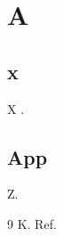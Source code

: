 \documentclass{book}
\begin{document}
\part{A}
\chapter{x}
X \cite{k}.
\appendix
\chapter{App}
Z.
\backmatter
\begin{thebibliography}{9}
 K. Ref.
\end{thebibliography}
\end{document}
